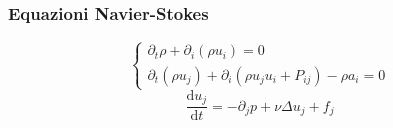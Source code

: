 \begin{frame}
  \frametitle{Equazioni Navier-Stokes}
    \[ \begin{cases}
      \partial_t \rho + \partial_i (\rho u_i) = 0 \\
      \partial_t (\rho u_j) + \partial_i(\rho u_j u_i + P_{ij}) - \rho a_i = 0
    \end{cases} \]
    \[ \frac{\mathrm{d}u_j}{\mathrm{d}t} = -\partial_j p + \nu \Delta u_j + f_j \]
\end{frame}
